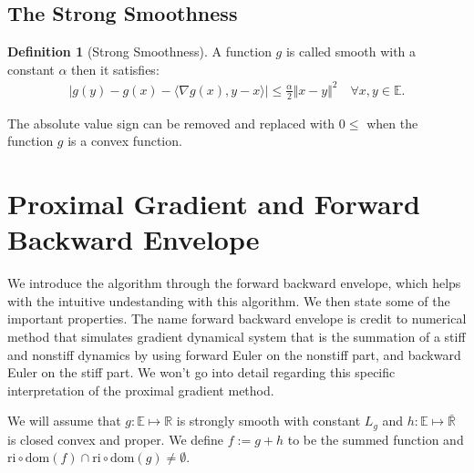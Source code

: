 \documentclass[]{article}
\theoremstyle{definition}
\newtheorem{definition}{Definition}
\begin{document}
    \subsection{The Strong Smoothness}
        \begin{definition}[Strong Smoothness]\label{def:strong_smoothness}
            A function $g$ is called smooth with a constant $\alpha$ then it satisfies: 
            \begin{align}
                |g(y) - g(x) - 
                \langle \nabla g(x), y - x
                \rangle| \le \frac{\alpha}{2}\Vert x - y\Vert^2
                \quad \forall x, y\in \mathbb E. 
            \end{align}    
        \end{definition}
        The absolute value sign can be removed and replaced with $0\le$ when the function $g$ is a convex function.
        
\section{Proximal Gradient and Forward Backward Envelope}\label{sec:pg_forward_backward_env}
    We introduce the algorithm through the forward backward envelope, which helps with the intuitive undestanding with this algorithm. We then state some of the important properties. The name forward backward envelope is credit to numerical method that simulates gradient dynamical system that is the summation of a stiff and nonstiff dynamics by using forward Euler on the nonstiff part, and backward Euler on the stiff part. We won't go into detail regarding this specific interpretation of the proximal gradient method. 
    \begin{assumption}\label{assumption:1}
        We will assume that $g:\mathbb E\mapsto \mathbb R$ is strongly smooth with constant $L_g$ and $h:\mathbb E \mapsto \bar{\mathbb R}$ is closed convex and proper. We define $f := g + h$ to be the summed function and $\text{ri}\circ \text{dom}(f) \cap \text{ri}\circ \text{dom}(g) \neq \emptyset$. 
    \end{assumption}
    
\end{document}
